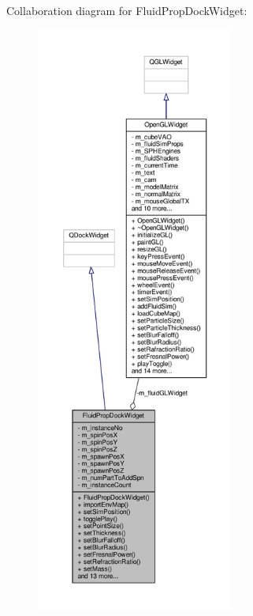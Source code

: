 Collaboration diagram for Fluid\-Prop\-Dock\-Widget\-:\nopagebreak
\begin{figure}[H]
\begin{center}
\leavevmode
\includegraphics[height=550pt]{class_fluid_prop_dock_widget__coll__graph}
\end{center}
\end{figure}
